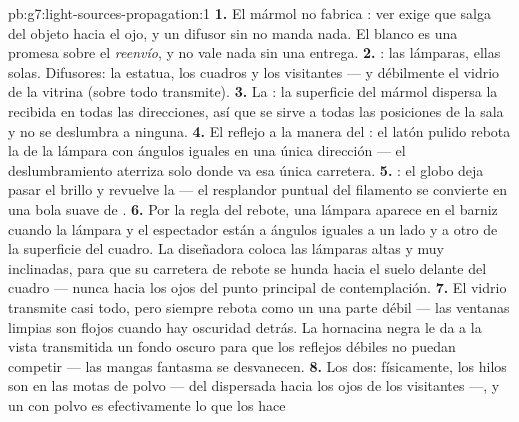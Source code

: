 \begin{solution}{pb:g7:light-sources-propagation:1}
\textbf{1.} El mármol no fabrica : ver exige que salga 
del objeto hacia el ojo, y un difusor sin  no manda nada. El blanco
es una promesa sobre el \emph{reenvío}, y no vale nada sin una
entrega.
\textbf{2.} : las lámparas, ellas solas.
Difusores: la estatua, los cuadros y los visitantes --- y débilmente
el vidrio de la vitrina (sobre todo transmite).
\textbf{3.} La : la superficie del mármol dispersa la
 recibida en todas las direcciones, así que se sirve a todas
las posiciones de la sala y no se deslumbra a ninguna.
\textbf{4.} El reflejo a la manera del : el latón pulido
rebota la  de la lámpara con ángulos iguales en una única
dirección --- el deslumbramiento aterriza solo donde va esa única
carretera.
\textbf{5.} : el globo deja pasar el brillo y revuelve
la  --- el resplandor puntual del filamento se convierte en
una bola suave de .
\textbf{6.} Por la regla del rebote, una lámpara aparece en el barniz
cuando la lámpara y el espectador están a ángulos iguales a un lado y
a otro de la superficie del cuadro. La diseñadora coloca las lámparas
altas y muy inclinadas, para que su carretera de rebote se hunda hacia
el suelo delante del cuadro --- nunca hacia los ojos del punto
principal de contemplación.
\textbf{7.} El vidrio transmite casi todo, pero siempre rebota como un
 una parte débil --- las ventanas limpias son  flojos
cuando hay oscuridad detrás. La hornacina negra le da a la vista
transmitida un fondo oscuro para que los reflejos débiles no puedan
competir --- las mangas fantasma se desvanecen.
\textbf{8.} Los dos: físicamente, los hilos son  en las
motas de polvo ---  del  dispersada hacia los ojos de los
visitantes ---, y un  con polvo es efectivamente lo que los hace

\end{solution}
